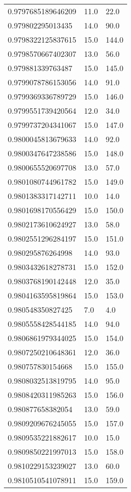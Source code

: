 \begin{center}
\begin{supertabular}[H]{p{0.30\textwidth}p{0.05\textwidth}p{0.05\textwidth}}
0.9797685189646209 & 11.0 & 22.0 \\ 
0.979802295013435 & 14.0 & 90.0 \\ 
0.9798322125837615 & 15.0 & 144.0 \\ 
0.9798570667402307 & 13.0 & 56.0 \\ 
0.979881339763487 & 15.0 & 145.0 \\ 
0.9799078786153056 & 14.0 & 91.0 \\ 
0.9799369336789729 & 15.0 & 146.0 \\ 
0.9799551739420564 & 12.0 & 34.0 \\ 
0.9799737204341067 & 15.0 & 147.0 \\ 
0.9800045813679633 & 14.0 & 92.0 \\ 
0.9800347647238586 & 15.0 & 148.0 \\ 
0.9800655520697708 & 13.0 & 57.0 \\ 
0.9801080744961782 & 15.0 & 149.0 \\ 
0.9801383317142711 & 10.0 & 14.0 \\ 
0.9801698170556429 & 15.0 & 150.0 \\ 
0.9802173610624927 & 13.0 & 58.0 \\ 
0.9802551296284197 & 15.0 & 151.0 \\ 
0.980295876264998 & 14.0 & 93.0 \\ 
0.9803432618278731 & 15.0 & 152.0 \\ 
0.9803768190142448 & 12.0 & 35.0 \\ 
0.9804163595819864 & 15.0 & 153.0 \\ 
0.980548350827425 & 7.0 & 4.0 \\ 
0.9805558428544185 & 14.0 & 94.0 \\ 
0.9806861979344025 & 15.0 & 154.0 \\ 
0.9807250210648361 & 12.0 & 36.0 \\ 
0.980757830154668 & 15.0 & 155.0 \\ 
0.9808032513819795 & 14.0 & 95.0 \\ 
0.9808420311985263 & 15.0 & 156.0 \\ 
0.980877658382054 & 13.0 & 59.0 \\ 
0.9809209676245055 & 15.0 & 157.0 \\ 
0.9809535221882617 & 10.0 & 15.0 \\ 
0.9809850221997013 & 15.0 & 158.0 \\ 
0.9810229153239027 & 13.0 & 60.0 \\ 
0.9810510541078911 & 15.0 & 159.0 \\ 

\end{supertabular}
\end{center}
